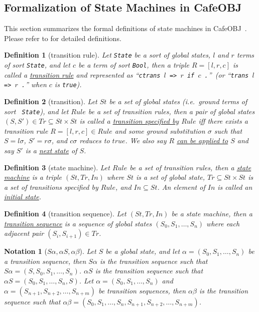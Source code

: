 \documentclass[12pt]{report}
\newtheorem{notation}{Notation}
\newtheorem{definition}{Definition}
\newcommand{\stt}[1]{{\small{\tt {#1}}}}
\newcommand{\ul}{\underline}
\newcommand{\cafeobj}{{\sf CafeOBJ}~}
\begin{document}
\subsection{Formalization of State Machines in \cafeobj}
\label{sec:statemachine}
This section summarizes the formal definitions of state machines in
\cafeobj. Please refer to \cite{Futatsugi15} for detailed
definitions.
\begin{definition}[transition rule]
  Let {\tt State} be a sort of global states, $l$ and $r$ terms of
  sort {\tt State}, and let $c$ be a term of sort {\tt Bool}, then a
  triple $R = [l,r,c]$ is called a \ul{transition rule} and
  represented as ``\stt{ctrans $l$ => $r$ if $c$ .}''~(or ``\stt{trans
    $l$ => $r$ .}'' when $c$ is \stt{true}).
\end{definition}
\begin{definition}[transition]
  Let $\mathit{St}$ be a set of global states (i.e.\ ground terms of sort {\tt
    State}), and let $Rule$ be a set of transition rules, then a pair of
  global states $(S,S')\in \mathit{Tr}\subseteq \mathit{St}\times \mathit{St}$ is called a
  \ul{transition specified by} $Rule$ iff there exists a transition
  rule $R=[l,r,c]\in Rule$ and some ground substitution $\sigma$ such
  that $S=l\sigma$, $S'=r\sigma$, and $c\sigma$ reduces to $true$. We
  also say $R$ \ul{can be applied to} $S$ and say $S'$ is a \ul{next
    state} of $S$.
\end{definition}
\begin{definition}[state machine]
  Let $Rule$ be a set of transition rules, then a \ul{state machine}
  is a triple $(\mathit{St},\mathit{Tr},In)$ where $\mathit{St}$ is a set of global state,
  $\mathit{Tr}\subseteq \mathit{St}\times \mathit{St}$ is a set of transitions specified by
  $Rule$, and $In \subseteq \mathit{St}$. An element of $In$ is called an
  \ul{initial state}.
\end{definition}
\begin{definition}[transition sequence]
  Let $(\mathit{St},\mathit{Tr},In)$ be a state machine, then a \ul{transition sequence} is a
  sequence of global states $(\mathit{S_0},\mathit{S_1},\dots,\mathit{S_n})$ where each adjacent
  pair $(\mathit{S_i},\mathit{S_{i+1}}) \in \mathit{Tr}$. 
\end{definition}
\begin{notation}[$S\alpha,\alpha S,\alpha\beta$]
  Let $S$ be a global state, and let $\alpha=(\mathit{S_0},\mathit{S_1},\dots,\mathit{S_n})$ be a
  transition sequence, then \ul{$S\alpha$} is the transition sequence
  such that $S\alpha=(S,\mathit{S_0},\mathit{S_1},\dots,\mathit{S_n})$.  \ul{$\alpha S$} is the
  transition sequence such that $\alpha S=(\mathit{S_0},\mathit{S_1},\dots,\mathit{S_n},S)$.  Let
  $\alpha=(\mathit{S_0},\mathit{S_1},\dots,\mathit{S_n})$ and
  $\alpha=(\mathit{S_{n+1}},\mathit{S_{n+2}},\dots,\mathit{S_{n+m}})$ be transition sequences,
  then \ul{$\alpha\beta$} is the transition sequence such that
  $\alpha\beta=(\mathit{S_0},\mathit{S_1},\dots,\mathit{S_n},\mathit{S_{n+1}},\mathit{S_{n+2}},\dots,\mathit{S_{n+m}})$.
\end{notation}
\end{document}
